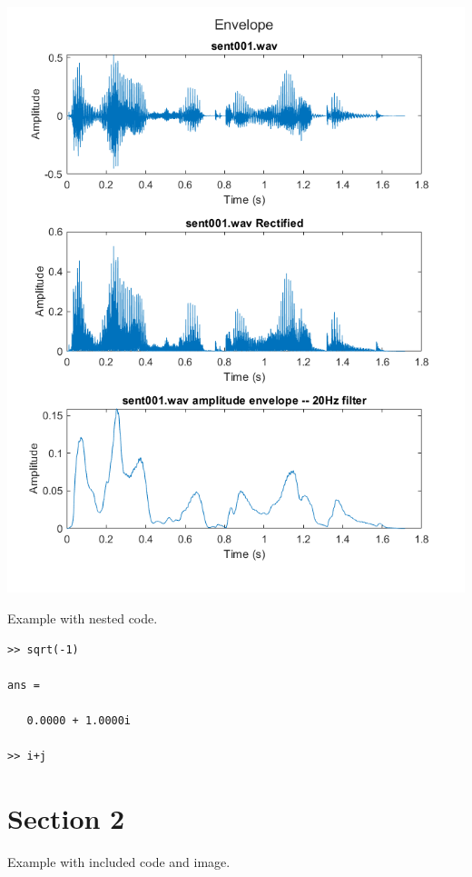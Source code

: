 \documentclass[11pt]{article}
\begin{document}


\includegraphics[width=\textwidth]{exercise4.png}


Example with nested code.

\begin{lstlisting}
>> sqrt(-1)

ans =

   0.0000 + 1.0000i

>> i+j
\end{lstlisting}


\pagebreak
\section{Section 2}

Example with included code and image.


\end{document}
